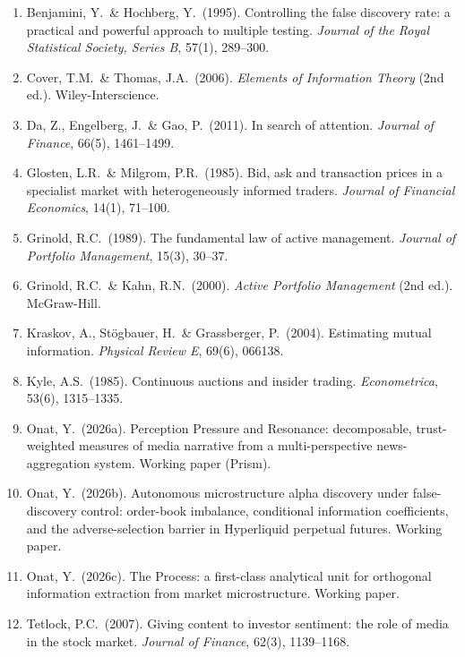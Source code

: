\documentclass[11pt,a4paper]{article}
\theoremstyle{definition}
\theoremstyle{plain}
\begin{document}
\begin{enumerate}
  \item Benjamini, Y.\ \& Hochberg, Y.\ (1995). Controlling the false discovery rate: a practical and
        powerful approach to multiple testing. \textit{Journal of the Royal Statistical Society,
        Series B}, 57(1), 289--300.

  \item Cover, T.M.\ \& Thomas, J.A.\ (2006). \textit{Elements of Information Theory} (2nd ed.).
        Wiley-Interscience.

  \item Da, Z., Engelberg, J.\ \& Gao, P.\ (2011). In search of attention.
        \textit{Journal of Finance}, 66(5), 1461--1499.

  \item Glosten, L.R.\ \& Milgrom, P.R.\ (1985). Bid, ask and transaction prices in a specialist
        market with heterogeneously informed traders. \textit{Journal of Financial Economics}, 14(1),
        71--100.

  \item Grinold, R.C.\ (1989). The fundamental law of active management.
        \textit{Journal of Portfolio Management}, 15(3), 30--37.

  \item Grinold, R.C.\ \& Kahn, R.N.\ (2000). \textit{Active Portfolio Management} (2nd ed.).
        McGraw-Hill.

  \item Kraskov, A., St\"ogbauer, H.\ \& Grassberger, P.\ (2004). Estimating mutual information.
        \textit{Physical Review E}, 69(6), 066138.

  \item Kyle, A.S.\ (1985). Continuous auctions and insider trading. \textit{Econometrica}, 53(6),
        1315--1335.

  \item Onat, Y.\ (2026a). Perception Pressure and Resonance: decomposable, trust-weighted measures of
        media narrative from a multi-perspective news-aggregation system. Working paper (Prism).

  \item Onat, Y.\ (2026b). Autonomous microstructure alpha discovery under false-discovery control:
        order-book imbalance, conditional information coefficients, and the adverse-selection barrier
        in Hyperliquid perpetual futures. Working paper.

  \item Onat, Y.\ (2026c). The Process: a first-class analytical unit for orthogonal information
        extraction from market microstructure. Working paper.

  \item Tetlock, P.C.\ (2007). Giving content to investor sentiment: the role of media in the stock
        market. \textit{Journal of Finance}, 62(3), 1139--1168.
\end{enumerate}
\end{document}
